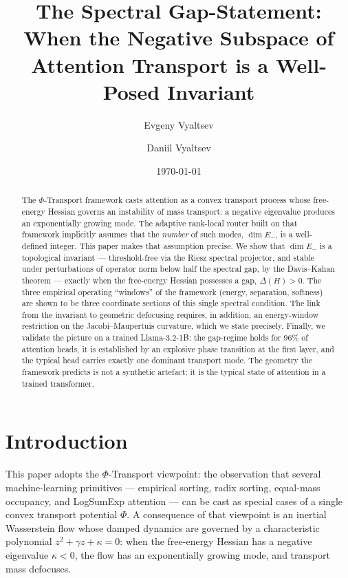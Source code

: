 \documentclass[11pt]{article}
\title{\textbf{The Spectral Gap-Statement:}\\[2pt]
  \large When the Negative Subspace of Attention Transport
  is a Well-Posed Invariant}
\author{Evgeny Vyaltsev \and Daniil Vyaltsev}
\date{\today}
\theoremstyle{plain}
\theoremstyle{definition}
\newcommand{\PaperOne}{the $\Phi$-Transport viewpoint}
\begin{document}
\maketitle

\begin{abstract}
The $\Phi$-Transport framework casts attention as a convex transport
process whose free-energy Hessian governs an instability of mass
transport: a negative eigenvalue produces an exponentially growing
mode. The adaptive rank-local router built on that framework implicitly
assumes that the \emph{number} of such modes, $\dim E_-$, is a
well-defined integer. This paper makes that assumption precise. We show
that $\dim E_-$ is a topological invariant --- threshold-free via the
Riesz spectral projector, and stable under perturbations of operator norm
below half the spectral gap, by the Davis--Kahan theorem --- exactly when
the free-energy Hessian possesses a gap, $\Delta(H)>0$. The three
empirical operating ``windows'' of the framework (energy, separation,
softness) are shown to be three coordinate sections of this single
spectral condition. The link from the invariant to geometric defocusing
requires, in addition, an energy-window restriction on the
Jacobi--Maupertuis curvature, which we state precisely. Finally, we
validate the picture on a trained Llama-3.2-1B: the gap-regime holds for
$96\%$ of attention heads, it is established by an explosive phase
transition at the first layer, and the typical head carries exactly one
dominant transport mode. The geometry the framework predicts is not a
synthetic artefact; it is the typical state of attention in a trained
transformer.
\end{abstract}

\section{Introduction}
\label{sec:intro}

This paper adopts \PaperOne{}: the observation that several
machine-learning primitives --- empirical sorting, radix sorting,
equal-mass occupancy, and LogSumExp attention --- can be cast as special
cases of a single convex transport potential $\Phi$. A consequence
of that viewpoint is an inertial Wasserstein flow whose damped dynamics
are governed by a characteristic polynomial $z^2+\gamma z+\kappa=0$: when
the free-energy Hessian has a negative eigenvalue $\kappa<0$, the flow has
an exponentially growing mode, and transport mass defocuses.
\end{document}
